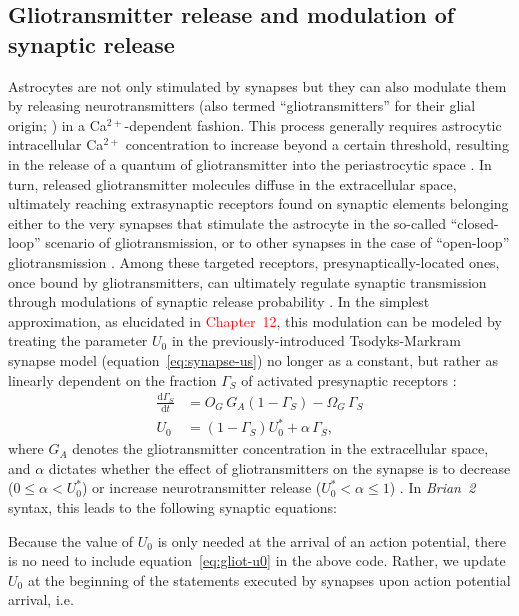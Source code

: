 \documentclass[a4paper, 11pt]{article}
\newcommand{\brian}{\emph{Brian~2}\xspace}
\newcommand{\der}[2]{\frac{\mathrm{d}#1}{\mathrm{d}#2}}
\renewcommand*{\eqref}[1]{equation~\ref{#1}}
\begin{document}
\subsection{Gliotransmitter release and modulation of synaptic release}\label{sec:gliot-open}
Astrocytes are not only stimulated by synapses but they can also modulate them by releasing neurotransmitters (also termed ``gliotransmitters'' for their glial origin; \citealp{BezziVolterraRev2001}) in a Ca$^{2+}$-dependent fashion.
This process generally requires astrocytic intracellular Ca$^{2+}$ concentration to increase beyond a certain threshold, resulting in the release of a quantum of gliotransmitter into the periastrocytic space \citep{DePitta_FCN13}.
In turn, released gliotransmitter molecules diffuse in the extracellular space, ultimately reaching extrasynaptic receptors found on synaptic elements belonging either to the very synapses that stimulate the astrocyte in the so-called ``closed-loop'' scenario of gliotransmission, or to other synapses in the case of ``open-loop'' gliotransmission \citep{Araque_Neuron2014}.
Among these targeted receptors, presynaptically-located ones, once bound by gliotransmitters, can ultimately regulate synaptic transmission through modulations of synaptic release probability \citep{EngelmanMacDermott_NatRev2004,PinheiroMulle_NatRev2008}.
In the simplest approximation, as elucidated in \textcolor{red}{Chapter~12}, this modulation can be modeled by treating the parameter $U_0$ in the previously-introduced Tsodyks-Markram synapse model (\eqref{eq:synapse-us}) no longer as a constant, but rather as linearly dependent on the fraction $\Gamma_S$ of activated presynaptic receptors \citep{DePitta_PCB11}:
\begin{align}
\der{\Gamma_S}{t} &= O_G\,G_A(1-\Gamma_S) - \Omega_G\,\Gamma_S\\
U_0 &= (1-\Gamma_S)U_0^{*} + \alpha\,\Gamma_S, \label{eq:gliot-u0}
\end{align}
where $G_A$ denotes the gliotransmitter concentration in the extracellular space, and $\alpha$ dictates whether the effect of gliotransmitters on the synapse is to decrease ($0\le \alpha < U_0^*$) or increase neurotransmitter release ($U_0^* < \alpha \le 1$) \citep{DePitta_PCB11}.
In \brian syntax, this leads to the following synaptic equations:

Because the value of $U_0$ is only needed at the arrival of an action potential, there is no need to include \eqref{eq:gliot-u0} in the above code. Rather, we update $U_0$ at the beginning of the statements executed by synapses upon action potential arrival, i.e.

\end{document}
